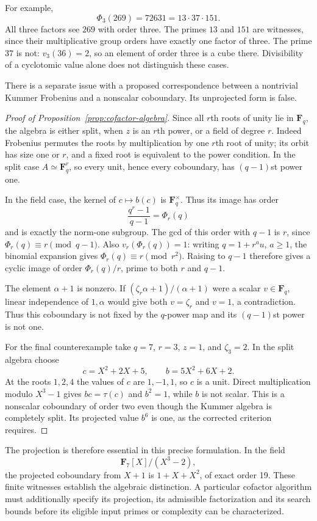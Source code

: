 \documentclass[11pt]{article}
\theoremstyle{remark}\newtheorem{remark}[theorem]{Remark}
\begin{document}
For example,
\[
 \Phi_3(269)=72631=13\cdot37\cdot151.
\]
All three factors see $269$ with order three. The primes $13$ and $151$ are witnesses, since their multiplicative group orders have exactly one factor of three. The prime $37$ is not: $v_3(36)=2$, so an element of order three is a cube there. Divisibility of a cyclotomic value alone does not distinguish these cases.

There is a separate issue with a proposed correspondence between a nontrivial Kummer Frobenius and a nonscalar coboundary. Its unprojected form is false.

\begin{proof}[Proof of Proposition~\ref{prop:cofactor-algebra}]
Since all $r$th roots of unity lie in $\mathbf F_q$, the algebra is either split, when $z$ is an $r$th power, or a field of degree $r$. Indeed Frobenius permutes the roots by multiplication by one $r$th root of unity; its orbit has size one or $r$, and a fixed root is equivalent to the power condition. In the split case $A\simeq\mathbf F_q^r$, so every unit, hence every coboundary, has $(q-1)$st power one.

In the field case, the kernel of $c\mapsto b(c)$ is $\mathbf F_q^\times$. Thus its image has order
\[
 \frac{q^r-1}{q-1}=\Phi_r(q)
\]
and is exactly the norm-one subgroup. The gcd of this order with $q-1$ is $r$, since $\Phi_r(q)\equiv r\pmod{q-1}$. Also $v_r(\Phi_r(q))=1$: writing $q=1+r^a u$, $a\ge1$, the binomial expansion gives $\Phi_r(q)\equiv r\pmod{r^2}$. Raising to $q-1$ therefore gives a cyclic image of order $\Phi_r(q)/r$, prime to both $r$ and $q-1$.

The element $\alpha+1$ is nonzero. If
$(\zeta_r\alpha+1)/(\alpha+1)$ were a scalar $v\in\mathbf F_q$, linear independence of $1,\alpha$ would give both $v=\zeta_r$ and $v=1$, a contradiction. Thus this coboundary is not fixed by the $q$-power map and its $(q-1)$st power is not one.

For the final counterexample take $q=7$, $r=3$, $z=1$, and $\zeta_3=2$. In the split algebra choose
\[
 c=X^2+2X+5,\qquad b=5X^2+6X+2.
\]
At the roots $1,2,4$ the values of $c$ are $1,-1,1$, so $c$ is a unit. Direct multiplication modulo $X^3-1$ gives $bc=\tau(c)$ and $b^2=1$, while $b$ is not scalar. This is a nonscalar coboundary of order two even though the Kummer algebra is completely split. Its projected value $b^6$ is one, as the corrected criterion requires.
\end{proof}

The projection is therefore essential in this precise formulation. In the field
\[
 \mathbf F_7[X]/(X^3-2),
\]
the projected coboundary from $X+1$ is $1+X+X^2$, of exact order 19. These finite witnesses establish the algebraic distinction. A particular cofactor algorithm must additionally specify its projection, its admissible factorization and its search bounds before its eligible input primes or complexity can be characterized.
\end{document}

